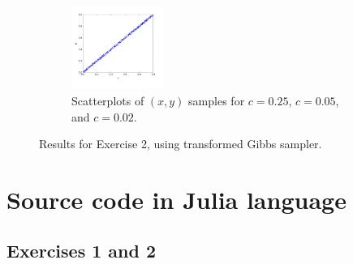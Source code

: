 \documentclass[12pt]{article}
\begin{document}
\begin{figure}
\begin{subfigure}[t]{1\textwidth}
            \includegraphics[trim=0.8cm 0.4cm 0.8cm 0, clip, width=0.325\textwidth]{code/box-scatter-c=0.02-transformed.png}
        \caption{Scatterplots of $(x,y)$ samples for $c = 0.25$, $c = 0.05$, and $c = 0.02$.}
    \end{subfigure}
    \vspace{.5em}
    \caption{Results for Exercise 2, using transformed Gibbs sampler.}
    \label{figure:box-transformed}
\end{figure}




\appendix
\section{Source code in Julia language}

\subsection*{Exercises 1 and 2}

\end{document}
